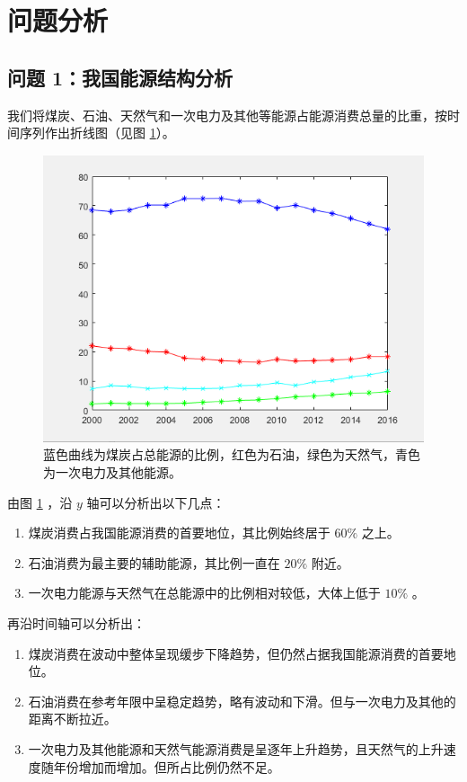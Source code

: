 \section{问题分析}

  \subsection{问题 1：我国能源结构分析}

    我们将煤炭、石油、天然气和一次电力及其他等能源占能源消费总量的比重，按时间序列作出折线图（见图 \ref{fig:nenyuanxiaofeibizhong}）。
    \begin{figure}[hb]
      \centering
      \includegraphics[scale=0.6]{figures/fig1.png}
      \captionsetup{format=hang}
      \caption[煤炭、石油、天然气和一次电力及其他等能源占能源消费总量的比重]{蓝色曲线为煤炭占总能源的比例，红色为石油，绿色为天然气，青色为一次电力及其他能源。}
      \label{fig:nenyuanxiaofeibizhong}
    \end{figure}

    由图 \ref{fig:nenyuanxiaofeibizhong} ，沿 $y$ 轴可以分析出以下几点：
    \begin{enumerate}
      \item 煤炭消费占我国能源消费的首要地位，其比例始终居于 $60\%$ 之上。
      \item 石油消费为最主要的辅助能源，其比例一直在 $20\%$ 附近。
      \item 一次电力能源与天然气在总能源中的比例相对较低，大体上低于 $10\%$ 。
    \end{enumerate}

    再沿时间轴可以分析出：
    \begin{enumerate}
      \item 煤炭消费在波动中整体呈现缓步下降趋势，但仍然占据我国能源消费的首要地位。
      \item 石油消费在参考年限中呈稳定趋势，略有波动和下滑。但与一次电力及其他的距离不断拉近。
      \item 一次电力及其他能源和天然气能源消费是呈逐年上升趋势，且天然气的上升速度随年份增加而增加。但所占比例仍然不足。
    \end{enumerate}

